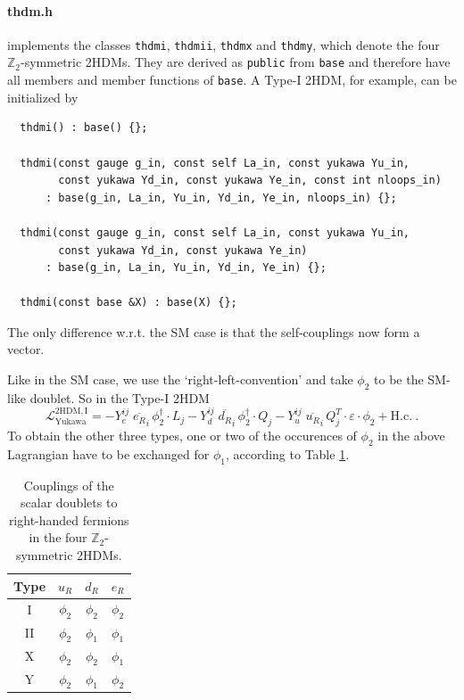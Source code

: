 \documentclass[11pt,a4paper]{article}
\begin{document}
\paragraph{thdm.h}
implements the classes \texttt{thdmi}, \texttt{thdmii}, \texttt{thdmx} and \texttt{thdmy}, which denote the four $\mathbb{Z}_2$-symmetric 2HDMs.
They are derived as \texttt{public} from \texttt{base} and therefore have all members and member functions of \texttt{base}.
A Type-I 2HDM, for example, can be initialized by
\begin{lstlisting}
  thdmi() : base() {};
 
  thdmi(const gauge g_in, const self La_in, const yukawa Yu_in,
        const yukawa Yd_in, const yukawa Ye_in, const int nloops_in)
      : base(g_in, La_in, Yu_in, Yd_in, Ye_in, nloops_in) {};
      
  thdmi(const gauge g_in, const self La_in, const yukawa Yu_in,
        const yukawa Yd_in, const yukawa Ye_in)
      : base(g_in, La_in, Yu_in, Yd_in, Ye_in) {};
      
  thdmi(const base &X) : base(X) {};
\end{lstlisting}
The only difference w.r.t. the SM case is that the self-couplings now form a vector.

Like in the SM case, we use the `right-left-convention' and take $\phi_2$ to be the SM-like doublet. So in the Type-I 2HDM
\begin{equation} \label{eq:thdm_yuk}
    \mathcal{L}_{\mathrm{Yukawa}}^{\mathrm{2HDM,I}} = - Y_e^{ij}\; \overline{e_{R}}_{i} \, \phi_2^\dagger \cdot L_j
  - Y_d^{ij}\; \overline{d_{R}}_{i} \, \phi_2^\dagger \cdot Q_j
  - Y_u^{ij}\; \overline{u_{R}}_{i} \, Q_j^T \cdot \varepsilon \cdot \phi_2 + \mathrm{H.c.}~.
\end{equation}
To obtain the other three types, one or two of the occurences of $\phi_2$ in the above Lagrangian have to be exchanged for $\phi_1$, according to Table \ref{tbl::2hdm}.

\begin{table}
  \centering
  \begin{tabular}{cccc} \toprule
    Type & $u_R$ & $d_R$ & $e_R$ \\\midrule
    I & $\phi_2$ & $\phi_2$ & $\phi_2$ \\
    II & $\phi_2$ & $\phi_1$ & $\phi_1$ \\
    X & $\phi_2$ & $\phi_2$ & $\phi_1$ \\
    Y & $\phi_2$ & $\phi_1$ & $\phi_2$ \\
    \bottomrule
  \end{tabular}
  \caption{\label{tbl::2hdm} Couplings of the scalar doublets to right-handed fermions in the four $\mathbb{Z}_2$-symmetric 2HDMs.}
\end{table}
\end{document}
